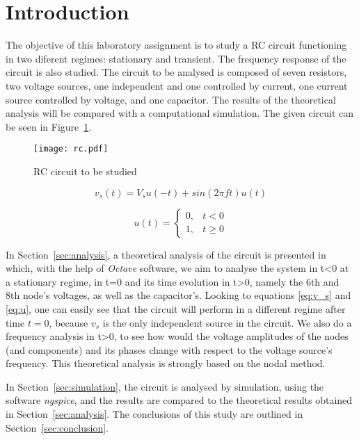\section{Introduction}
\label{sec:introduction}

\par The objective of this laboratory assignment is to study a RC circuit functioning in two diferent regimes: stationary and transient. The frequency response of the circuit is also studied. The circuit to be analysed is composed of seven resistors, two voltage sources, one independent and one controlled by current, one current source controlled by voltage, and one capacitor. The results of the theoretical analysis will be compared with a computational simulation. The given circuit can be seen in Figure~\ref{fig:circuit}.

\begin{figure}[H]
\centering
\texttt{[image: rc.pdf]}
\caption{RC circuit to be studied}
\label{fig:circuit}
\end{figure}

\begin{multicols}{2}
\begin{equation}
    v_s(t) = V_s u(-t) + sin(2 \pi ft) u(t)
    \label{eq:v_s}
\end{equation}

\begin{equation}
    u(t) = \left \{ \begin{matrix} 0, & t<0 \\ 1, & t\geqslant 0 \end{matrix} \right.
    \label{eq:u}
\end{equation}
\end{multicols}

\par In Section~\ref{sec:analysis}, a theoretical analysis of the circuit is presented in which, with the help of \textit{Octave} software, we aim to analyse the system  in t<0 at a stationary regime, in t=0 and its time evolution in t>0, namely the 6th and 8th node's voltages, as well as the capacitor's.
Looking to equations \ref{eq:v_s} and \ref{eq:u}, one can easily see that the circuit will perform in a different regime after time $t=0$, because $v_s$ is the only independent source in the circuit. We also do a frequency analysis in t>0, to see how would the voltage amplitudes of the nodes (and components) and its phases change 
with respect to the voltage source's frequency. This theoretical analysis is strongly based on the nodal method.

\par In Section~\ref{sec:simulation}, the circuit is analysed by
simulation, using the software \textit{ngspice}, and the results are compared to the theoretical results obtained in
Section~\ref{sec:analysis}. The conclusions of this study are outlined in Section~\ref{sec:conclusion}.
